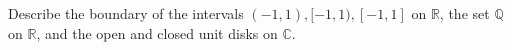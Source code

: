 Describe the boundary of the intervals $(-1,1),[-1,1),[-1,1]$ on $\mathbb{R}$, the set $\mathbb{Q}$ on
$\mathbb{R}$, and the open and closed unit disks on $\mathbb{C}$.\\